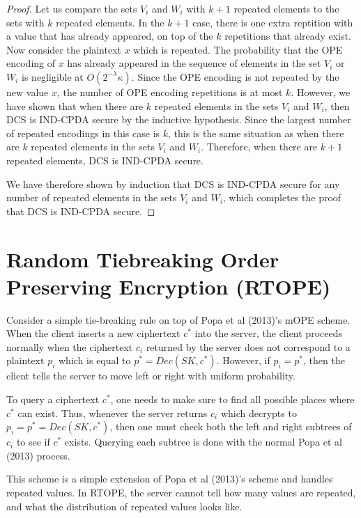 \documentclass[12pt]{article}
\begin{document}
\begin{proof}
Let us compare the sets $V_i$ and $W_i$ with $k+1$ repeated elements to the sets with $k$ repeated elements. In the $k+1$ case, there is one extra reptition with a value that has already appeared, on top of the $k$ repetitions that already exist. Now consider the plaintext $x$ which is repeated. The probability that the OPE encoding of $x$ has already appeared in the sequence of elements in the set $V_i$ or $W_i$ is negligible at $O(2^{-\lambda} \kappa)$. Since the OPE encoding is not repeated by the new value $x$, the number of OPE encoding repetitions is at most $k$. However, we have shown that when there are $k$ repeated elements in the sets $V_i$ and $W_i$, then DCS is IND-CPDA secure by the inductive hypothesis. Since the largest number of repeated encodings in this case is $k$, this is the same situation as when there are $k$ repeated elements in the sets $V_i$ and $W_i$. Therefore, when there are $k+1$ repeated elements, DCS is IND-CPDA secure.

We have therefore shown by induction that DCS is IND-CPDA secure for any number of repeated elements in the sets $V_i$ and $W_i$, which completes the proof that DCS is IND-CPDA secure.
\end{proof}

\section{Random Tiebreaking Order Preserving Encryption (RTOPE)}

  Consider a simple tie-breaking rule on top of Popa et al (2013)'s mOPE scheme. When the client inserts a new ciphertext $c^*$ into the server, the client proceeds normally when the ciphertext $c_i$ returned by the server does not correspond to a plaintext $p_i$ which is equal to $p^* = Dec(SK, c^*)$. However, if $p_i = p^*$, then the client tells the server to move left or right with uniform probability.

  To query a ciphertext $c^*$, one needs to make sure to find all possible places where $c^*$ can exist. Thus, whenever the server returns $c_i$ which decrypts to $p_i = p^* = Dec(SK, c^*)$, then one must check both the left and right subtrees of $c_i$ to see if $c^*$ exists. Querying each subtree is done with the  normal Popa et al (2013) process.

  This scheme is a simple extension of Popa et al (2013)'s scheme and handles repeated values. In RTOPE, the server cannot tell how many values are repeated, and what the distribution of repeated values looks like.
\end{document}
